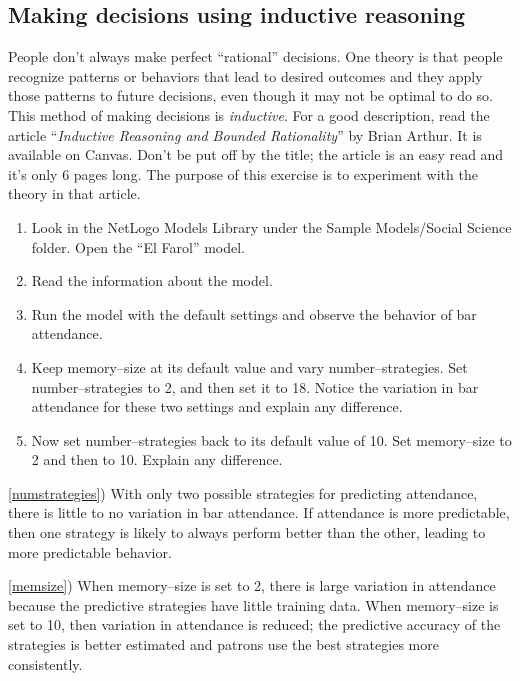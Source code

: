 \documentclass{article}
\begin{document}
\subsection{Making decisions using inductive reasoning}

People don't always make perfect ``rational'' decisions. One theory is
that people recognize patterns or behaviors that lead to desired
outcomes and they apply those patterns to future decisions, even
though it may not be optimal to do so. This method of making decisions
is \emph{inductive}. For a good description, read the article
``\emph{Inductive Reasoning and Bounded Rationality}'' by Brian Arthur. It is
available on Canvas.  Don't be put off by the title; the article is an
easy read and it's only 6 pages long.  The purpose of this exercise is
to experiment with the theory in that article.

\begin{enumerate}
\item Look in the NetLogo Models Library under the Sample Models/Social Science folder.
  Open the ``El Farol'' model.
\item Read the information about the model.
\item Run the model with the default settings and observe the behavior of
  bar attendance.
\item Keep memory--size at its default value and vary
  number--strategies.  Set number--strategies to 2, and then set it to
  18. Notice the variation in bar attendance for these two settings and explain any
  difference. \label{numstrategies}
\item Now set number--strategies back to its default value of 10.  Set
  memory--size to 2 and then to 10. Explain any difference.
  \label{memsize}
\end{enumerate}

\begin{solution}
  \bs
  
  \ref{numstrategies}) With only two possible strategies for predicting
  attendance, there is little to no variation in bar attendance. If attendance
  is more predictable, then one strategy is likely to always perform better
  than the other, leading to more predictable behavior.

  \ref{memsize}) When memory--size is set to 2, there is large variation in attendance
  because the predictive strategies have little training data. When memory--size
  is set to 10, then variation in attendance is reduced; the predictive accuracy of the
  strategies is better estimated and patrons use the best strategies more consistently.
  
\end{solution}
\end{document}
